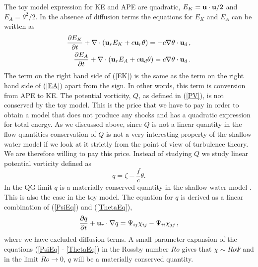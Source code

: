 The toy model expression for  KE and APE are quadratic,   $ E_K = {\bf u}\cdot {\bf u}/2 $ and $ E_A = \theta^2/2 $. 
In the absence of diffusion terms the equations for $ E_K $ and $ E_A $ can be written as
\begin{eqnarray} \label{EK}
\frac{\partial{E_K}} {\partial t} + \nabla \cdot ({\bf u}_rE_K+ c{\bf u}_r \theta) = - c \nabla \theta \cdot {\bf u}_d  \, , \\ \label{EA}
\frac{\partial{E_A}} {\partial t} + \nabla \cdot ({\bf u}_rE_A + c{\bf u}_d  \theta) =  c \nabla \theta \cdot {\bf u}_d \, .
\end{eqnarray}
 The term on the right hand side of  (\ref{EK}) is the same as the term on the right hand side of (\ref{EA}) apart from the sign. In other words, this term is conversion from APE to KE. 
The potential vorticity, $ Q $,  as defined in (\ref{PV}), is not conserved by the toy model. This is the price that we have to pay in order to obtain a model that does not produce any shocks and has a quadratic expression for total energy. As we discussed above, since $ Q $ is not a linear quantity in the flow quantities conservation of $ Q $  is not a very interesting property of the shallow water model if we look at it strictly from the point of view of turbulence theory. 
We are therefore willing to pay this price. Instead of studying $ Q $ we study  linear potential vorticity  \citep{Dritschel2001} defined as 
\begin{equation} \label{Linear}
q = \zeta - \frac{f}{c}\theta .
\end{equation}
In the QG limit $ q $ is a materially conserved quantity in the shallow water model \citep{Vallis:book}. This is also the case in the toy model. 
The equation for $ q $ is derived as a linear combination of  (\ref{PsiEq}) and (\ref{ThetaEq}),
\begin{equation}
\frac{\partial q }{\partial t} + {\bf u}_r \cdot \nabla q  =  \Psi_{ij} \chi_{ij} - \Psi_{ii} \chi_{jj} \, ,
\end{equation}  
where we have excluded diffusion terms. A small parameter expansion of  the equations (\ref{PsiEq} - \ref{ThetaEq}) in the Rossby number \citep{Vallis:book} $ Ro $ gives that $ \chi \sim Ro \Psi $ and in the limit $ Ro \rightarrow 0 $, $ q $ will be a materially conserved quantity. 
 

